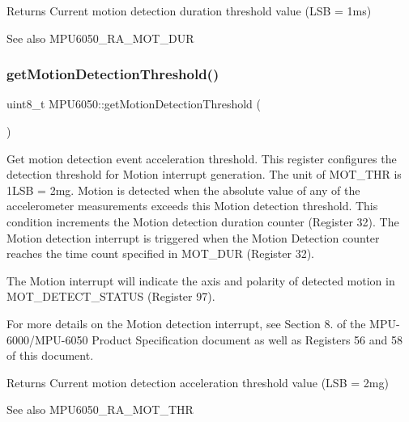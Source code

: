 \begin{DoxyReturn}{Returns}
Current motion detection duration threshold value (L\+SB = 1ms) 
\end{DoxyReturn}
\begin{DoxySeeAlso}{See also}
M\+P\+U6050\+\_\+\+R\+A\+\_\+\+M\+O\+T\+\_\+\+D\+UR 
\end{DoxySeeAlso}
\mbox{\label{class_m_p_u6050_ab7a825b1b8b86cebda308289630795e7}} 
\subsubsection{\texorpdfstring{getMotionDetectionThreshold()}{getMotionDetectionThreshold()}}
{\footnotesize\ttfamily uint8\+\_\+t M\+P\+U6050\+::get\+Motion\+Detection\+Threshold (\begin{DoxyParamCaption}{ }\end{DoxyParamCaption})}

Get motion detection event acceleration threshold. This register configures the detection threshold for Motion interrupt generation. The unit of M\+O\+T\+\_\+\+T\+HR is 1L\+SB = 2mg. Motion is detected when the absolute value of any of the accelerometer measurements exceeds this Motion detection threshold. This condition increments the Motion detection duration counter (Register 32). The Motion detection interrupt is triggered when the Motion Detection counter reaches the time count specified in M\+O\+T\+\_\+\+D\+UR (Register 32).

The Motion interrupt will indicate the axis and polarity of detected motion in M\+O\+T\+\_\+\+D\+E\+T\+E\+C\+T\+\_\+\+S\+T\+A\+T\+US (Register 97).

For more details on the Motion detection interrupt, see Section 8. of the M\+P\+U-\/6000/\+M\+P\+U-\/6050 Product Specification document as well as Registers 56 and 58 of this document.

\begin{DoxyReturn}{Returns}
Current motion detection acceleration threshold value (L\+SB = 2mg) 
\end{DoxyReturn}
\begin{DoxySeeAlso}{See also}
M\+P\+U6050\+\_\+\+R\+A\+\_\+\+M\+O\+T\+\_\+\+T\+HR 
\end{DoxySeeAlso}
\mbox{\label{class_m_p_u6050_af6e4fd231a9db99bd4270cf640eeae46}} 
